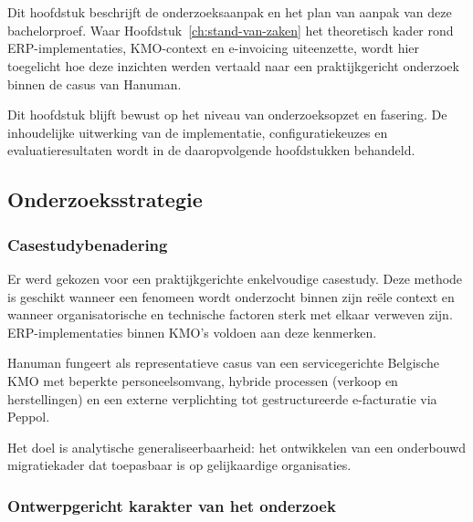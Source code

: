 
\chapter{}%
\label{ch:methodologie}

Dit hoofdstuk beschrijft de onderzoeksaanpak en het plan van aanpak van deze bachelorproef. Waar Hoofdstuk~\ref{ch:stand-van-zaken} het theoretisch kader rond ERP-implementaties, KMO-context en e-invoicing uiteenzette, wordt hier toegelicht hoe deze inzichten werden vertaald naar een praktijkgericht onderzoek binnen de casus van Hanuman. 

Dit hoofdstuk blijft bewust op het niveau van onderzoeksopzet en fasering. De inhoudelijke uitwerking van de implementatie, configuratiekeuzes en evaluatieresultaten wordt in de daaropvolgende hoofdstukken behandeld.

\section{Onderzoeksstrategie}

\subsection{Casestudybenadering}

Er werd gekozen voor een praktijkgerichte enkelvoudige casestudy. Deze methode is geschikt wanneer een fenomeen wordt onderzocht binnen zijn reële context en wanneer organisatorische en technische factoren sterk met elkaar verweven zijn. ERP-implementaties binnen KMO’s voldoen aan deze kenmerken.

Hanuman fungeert als representatieve casus van een servicegerichte Belgische KMO met beperkte personeelsomvang, hybride processen (verkoop en herstellingen) en een externe verplichting tot gestructureerde e-facturatie via Peppol.

Het doel is analytische generaliseerbaarheid: het ontwikkelen van een onderbouwd migratiekader dat toepasbaar is op gelijkaardige organisaties.

\subsection{Ontwerpgericht karakter van het onderzoek}

